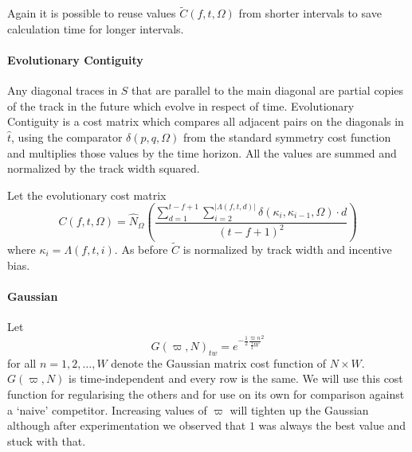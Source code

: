 \documentclass[twocolumn]{article}
\begin{document}



Again it is possible to reuse values $\tilde C(f,t,\Omega)$ from
shorter intervals to save calculation time for longer intervals.

	
	\paragraph{Evolutionary Contiguity}

	
	Any diagonal traces in $S$ that are parallel to the main diagonal are partial copies of the track in the future which evolve in respect of time. Evolutionary Contiguity is a cost matrix which compares all adjacent pairs on the diagonals in $\hat t$, using the comparator $\delta( p,q, \Omega )$ from the standard symmetry cost function and multiplies those values by the time horizon. All the values are summed and normalized by the track width squared. 
	
	Let the evolutionary cost matrix
	\begin{dmath*} C(f, t, \Omega) =  
		\hat N_\Omega\left(\frac{
		\sum_{d=1}^{t-f+1} 
		\sum_{i=2}^{|\Lambda( f,t,d )|}  \delta( \kappa_{i}, \kappa_{i-1}, \Omega ) \cdot d
	}{(t-f+1)^2}\right)
	\end{dmath*}  where  $\kappa_i=\Lambda( f,t,i )$. As before $\tilde C$ is normalized by track width and incentive bias.


	\paragraph{Gaussian}
	Let \[
	G( \varpi, N )_{tw} = e^{ - \frac{1}{2} \frac{\varpi n}{ \frac{1}{2} W}^2  }
	\] for all $n=1,2,\ldots,W$ denote the Gaussian matrix cost function of $N\times W$. $G( \varpi, N )$ is time-independent and every row is the same. We will use this cost function for regularising the others and for use on its own for comparison against a `naive' competitor. Increasing values of $\varpi$ will tighten up the Gaussian although after experimentation we observed that $1$ was always the best value and stuck with that.
	
\end{document}
